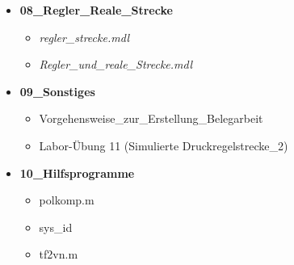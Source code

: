 \documentclass[11pt, a4paper,parskip=half]{article}
\begin{document}
\begin{itemize}
\item \textbf{08\_Regler\_Reale\_Strecke}
	\begin{itemize}
	\item \textit{regler\_strecke.mdl}
	\item \textit{Regler\_und\_reale\_Strecke.mdl}
	\end{itemize}
	
\item \textbf{09\_Sonstiges}
	\begin{itemize}
	\item Vorgehensweise\_zur\_Erstellung\_Belegarbeit
	\item Labor-Übung 11 (Simulierte Druckregelstrecke\_2)
	\end{itemize}
	
\item \textbf{10\_Hilfsprogramme}
	\begin{itemize}
	\item polkomp.m
	\item sys\_id
	\item tf2vn.m
	\end{itemize}

\end{itemize}





\newpage
\tableofcontents %




\newpage
\listoffigures
		
%  




\clearpage
\newpage
{}
\nocite{*}


\end{document}
